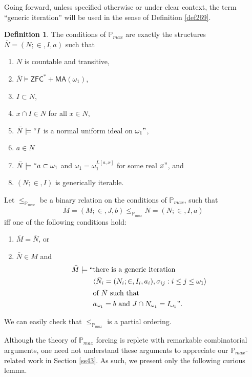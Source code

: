 \documentclass[12pt, twoside]{memoir}
\numberwithin{equation}{section}
\theoremstyle{definition}
\newtheorem{defi}[thm]{Definition}
\theoremstyle{remark}
\theoremstyle{definition}
\theoremstyle{definition}
\theoremstyle{definition}
\theoremstyle{remark}
\begin{document}
Going forward, unless specified otherwise or under clear context, the term ``generic iteration'' will be used in the sense of Definition \ref{def269}.

\begin{defi}\label{pmax}
The conditions of $\mathbb{P}_{max}$ are exactly the structures $\bar{N} = (N; \in, I, a)$ such that
\begin{enumerate}[label=(\alph*)]
    \item $N$ is countable and transitive,
    \item $\bar{N} \models \mathsf{ZFC}^* + \mathsf{MA}(\omega_1)$,
    \item $I \subset N$,
    \item $x \cap I \in N$ for all $x \in N$,
    \item $\bar{N} \models ``I$ is a normal uniform ideal on $\omega_1"$, 
    \item $a \in N$
    \item $\bar{N} \models ``a \subset \omega_1$ and $\omega_1 = \omega_1^{L[a, x]}$ for some real $x"$, and
    \item $(N; \in, I)$ is generically iterable.
\end{enumerate}
Let $\leq_{\mathbb{P}_{max}}$ be a binary relation on the conditions of $\mathbb{P}_{max}$, such that $$\bar{M} = (M; \in, J, b) \leq_{\mathbb{P}_{max}} \bar{N} = (N; \in, I, a)$$ iff one of the following conditions hold:
\begin{enumerate}[label=(\roman*)]
    \item $\bar{M} = \bar{N}$, or 
    \item $\bar{N} \in M$ and
    \begin{align*}
        \bar{M} \models `` & \text{there is a generic iteration } \\ 
        & \langle \bar{N}_i = (N_i; \in, I_i, a_i), \sigma_{ij} : i \leq j \leq \omega_1 \rangle \\
        & \text{of } \bar{N} \text{ such that} \\
        & a_{\omega_1} = b \text{ and } J \cap N_{\omega_1} = I_{\omega_1}".
    \end{align*}
\end{enumerate}
We can easily check that $\leq_{\mathbb{P}_{max}}$ is a partial ordering.
\end{defi}

Although the theory of $\mathbb{P}_{max}$ forcing is replete with remarkable combinatorial arguments, one need not understand these arguments to appreciate our $\mathbb{P}_{max}$-related work in Section \ref{ss43}. As such, we present only the following curious lemma.
\end{document}
